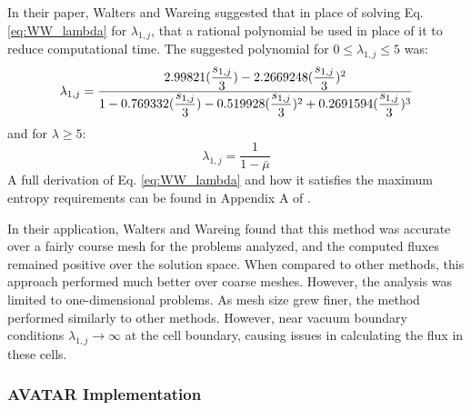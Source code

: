 In their paper, Walters and Wareing \cite{walters_accurate_1996} suggested that in place of
solving Eq. \eqref{eq:WW_lambda} for $\lambda_{1,j}$, that a rational polynomial
be used in place of it to reduce computational time. The
suggested polynomial for $0 \leq \lambda_{1,j} \leq 5$ was:
\newcommand{\lamvar}{\dfrac{s_{1,j}}{3}}
\begin{equation}
  \lambda_{1,j} =  \dfrac{2.99821 (\lamvar) - 2.2669248 (\lamvar)^2 }{1 - 0.769332
             (\lamvar) -0.519928 (\lamvar)^2 + 0.2691594 (\lamvar)^3} \\
\end{equation}
and for $\lambda \geq 5$:
\begin{equation}
  \lambda_{1,j} = \frac{1}{1-\bar\mu}
\end{equation}
A full derivation of Eq. \eqref{eq:WW_lambda} and how it satisfies the maximum
entropy requirements can be found in Appendix A of \cite{walters_accurate_1996}.

In their application, Walters and Wareing found that this method was accurate
over a fairly course mesh for the problems analyzed, and the computed fluxes
remained positive over the solution space. When compared to other methods, this
approach performed much better over coarse meshes. However, the analysis was
limited to one-dimensional problems. As mesh size grew finer, the method
performed similarly to other methods. However, near vacuum boundary conditions
$\lambda_{1,j} \rightarrow \infty$ at the cell boundary, causing issues in
calculating the flux in these cells.

\subsubsection*{AVATAR Implementation}


